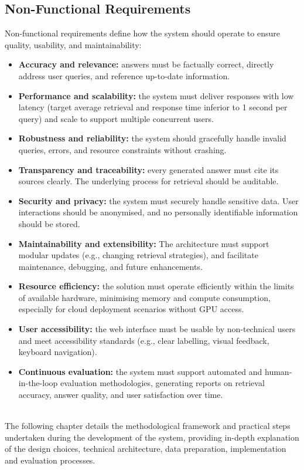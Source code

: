\begin{spacing}{1.5}
\subsection{Non-Functional Requirements}
Non-functional requirements define how the system should operate to ensure quality, usability, and maintainability:
\begin{itemize}
    \item \textbf{Accuracy and relevance:} answers must be factually correct, directly address user queries, and reference up-to-date information.
    \item \textbf{Performance and scalability:} the system must deliver responses with low latency (target average retrieval and response time inferior to 1 second per query) and scale to support multiple concurrent users.
    \item \textbf{Robustness and reliability:} the system should gracefully handle invalid queries, errors, and resource constraints without crashing.
    \item \textbf{Transparency and traceability:} every generated answer must cite its sources clearly. The underlying process for retrieval should be auditable.
    \item \textbf{Security and privacy:} the system must securely handle sensitive data. User interactions should be anonymised, and no personally identifiable information should be stored.
    \item \textbf{Maintainability and extensibility:} The architecture must support modular updates (e.g., changing retrieval strategies), and facilitate maintenance, debugging, and future enhancements.
    \item \textbf{Resource efficiency:} the solution must operate efficiently within the limits of available hardware, minimising memory and compute consumption, especially for cloud deployment scenarios without GPU access.
    \item \textbf{User accessibility:} the web interface must be usable by non-technical users and meet accessibility standards (e.g., clear labelling, visual feedback, keyboard navigation).
    \item \textbf{Continuous evaluation:} the system must support automated and human-in-the-loop evaluation methodologies, generating reports on retrieval accuracy, answer quality, and user satisfaction over time.
\end{itemize}

\citep{abu_shawar_chatbots_2007,arslan_survey_2024,gupta_comprehensive_2024}\\


The following chapter details the methodological framework and practical steps undertaken during the development of the system, providing in-depth explanation of the design choices, technical architecture, data preparation, implementation and evaluation processes.


\end{spacing}